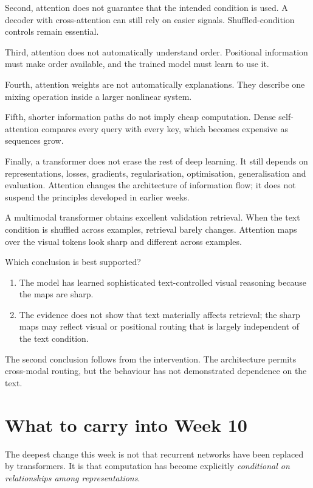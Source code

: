 Second, attention does not guarantee that the intended condition is used. A decoder with cross-attention can still rely on easier signals. Shuffled-condition controls remain essential.

Third, attention does not automatically understand order. Positional information must make order available, and the trained model must learn to use it.

Fourth, attention weights are not automatically explanations. They describe one mixing operation inside a larger nonlinear system.

Fifth, shorter information paths do not imply cheap computation. Dense self-attention compares every query with every key, which becomes expensive as sequences grow.

Finally, a transformer does not erase the rest of deep learning. It still depends on representations, losses, gradients, regularisation, optimisation, generalisation and evaluation. Attention changes the architecture of information flow; it does not suspend the principles developed in earlier weeks.

\begin{checkpointbox}
A multimodal transformer obtains excellent validation retrieval. When the text condition is shuffled across examples, retrieval barely changes. Attention maps over the visual tokens look sharp and different across examples.

Which conclusion is best supported?

\begin{enumerate}[leftmargin=*]
  \item The model has learned sophisticated text-controlled visual reasoning because the maps are sharp.
  \item The evidence does not show that text materially affects retrieval; the sharp maps may reflect visual or positional routing that is largely independent of the text condition.
\end{enumerate}
The second conclusion follows from the intervention. The architecture permits cross-modal routing, but the behaviour has not demonstrated dependence on the text.
\end{checkpointbox}

\section{What to carry into Week 10}

The deepest change this week is not that recurrent networks have been replaced by transformers. It is that computation has become explicitly \emph{conditional on relationships among representations}.

